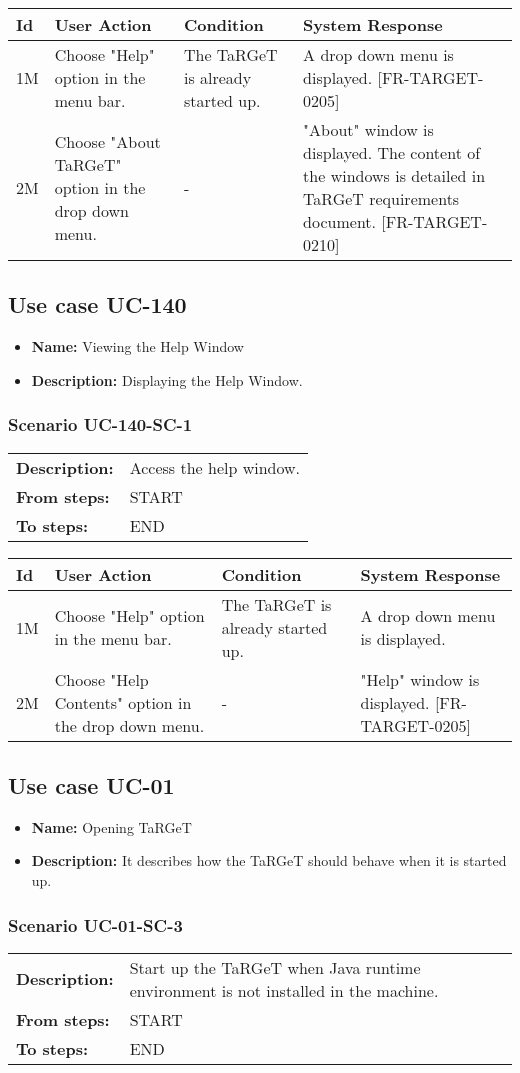 \documentclass[a4paper,11pt]{article}
\newcommand{\bl}{\\ \hline}
\begin{document}
\begin{tabular}{|p{0.8in}|p{1.6in}|p{1.6in}|p{1.6in}|}
\hline
Id & User Action & Condition & System Response  \bl 
1M & Choose "Help" option in the menu bar. & The TaRGeT is already started up. & A drop down menu is displayed. [FR-TARGET-0205] \bl 
2M & Choose "About TaRGeT" option in the drop down menu. & - & "About" window is displayed. The content of the windows is detailed in TaRGeT requirements document. [FR-TARGET-0210] \bl 
\end{tabular}
\subsection*{Use case UC-140}
\begin{itemize}
\item {\bf Name: }Viewing the Help Window
\item {\bf Description: }Displaying the Help Window.
\end{itemize}
\subsubsection*{Scenario UC-140-SC-1}
\begin{tabular}{p{1in}p{4in}}
{\bf Description:} & Access the help window. \\
{\bf From steps:} & START \\
{\bf To steps:} & END \\
\end{tabular}
 
\begin{tabular}{|p{0.8in}|p{1.6in}|p{1.6in}|p{1.6in}|}
\hline
Id & User Action & Condition & System Response  \bl 
1M & Choose "Help" option in the menu bar. & The TaRGeT is already started up. & A drop down menu is displayed. \bl 
2M & Choose "Help Contents" option in the drop down menu. & - & "Help" window is displayed. [FR-TARGET-0205] \bl 
\end{tabular}
\subsection*{Use case UC-01}
\begin{itemize}
\item {\bf Name: }Opening TaRGeT
\item {\bf Description: }It describes how the TaRGeT should behave when it is started up.
\end{itemize}
\subsubsection*{Scenario UC-01-SC-3}
\begin{tabular}{p{1in}p{4in}}
{\bf Description:} & Start up the TaRGeT when Java runtime environment is not installed in the machine. \\
{\bf From steps:} & START \\
{\bf To steps:} & END \\
\end{tabular}
 
\end{document}
